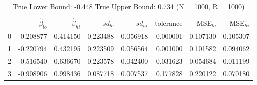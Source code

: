 \begin{table}
\caption{True Lower Bound: -0.448 True Upper Bound: 0.734 (N = 1000, R = 1000)}
\begin{tabular}{lrrrrrrr}
 & $\hat{\beta}_{lo}$ & $\hat{\beta}_{hi}$ & $sd_{lo}$ & $sd_{hi}$ & tolerance & MSE$_{lo}$ & MSE$_{hi}$ \\
0 & -0.208877 & 0.414150 & 0.223488 & 0.056918 & 0.000001 & 0.107130 & 0.105307 \\
1 & -0.220794 & 0.432195 & 0.223509 & 0.056564 & 0.001000 & 0.101582 & 0.094062 \\
2 & -0.516540 & 0.636670 & 0.223578 & 0.042400 & 0.031623 & 0.054684 & 0.011199 \\
3 & -0.908906 & 0.998436 & 0.087718 & 0.007537 & 0.177828 & 0.220122 & 0.070180 \\
\end{tabular}
\end{table}
